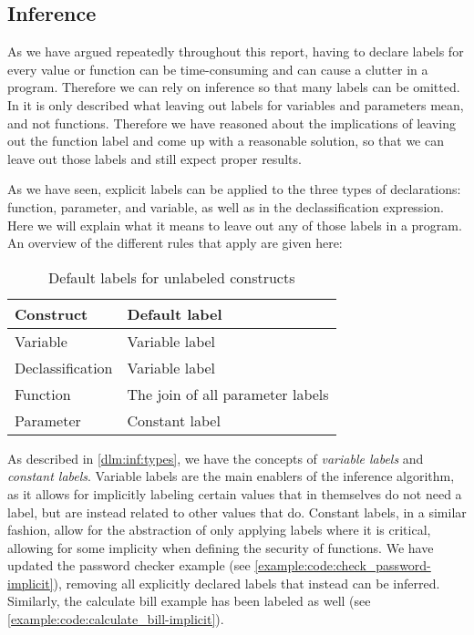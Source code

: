 \subsection{Inference}
As we have argued repeatedly throughout this report, having to declare labels for every value or function can be time-consuming and can cause a clutter in a program.
Therefore we can rely on inference so that many labels can be omitted.
In \cite{myers1997} it is only described what leaving out labels for variables and parameters mean, and not functions.
Therefore we have reasoned about the implications of leaving out the function label and come up with a reasonable solution, so that we can leave out those labels and still expect proper results.

As we have seen, explicit labels can be applied to the three types of declarations: function, parameter, and variable, as well as in the declassification expression.
Here we will explain what it means to leave out any of those labels in a program.
An overview of the different rules that apply are given here:
\begin{table}[H]
  \begin{tabularx}{\textwidth}{|l|X|}
    \hline
    \textbf{Construct} & \textbf{Default label} \\ \hline \hline
    Variable & Variable label \\ \hline
    Declassification & Variable label \\ \hline
    Function & The join of all parameter labels \\ \hline
    Parameter & Constant label \\ \hline
  \end{tabularx}
  \caption{Default labels for unlabeled constructs}
  \label{informal:table:default_labels}
\end{table}

As described in \cref{dlm:inf:types}, we have the concepts of \emph{variable labels} and \emph{constant labels}.
Variable labels are the main enablers of the inference algorithm, as it allows for implicitly labeling certain values that in themselves do not need a label, but are instead related to other values that do.
Constant labels, in a similar fashion, allow for the abstraction of only applying labels where it is critical, allowing for some implicity when defining the security of functions.
We have updated the password checker example (see \cref{example:code:check_password-implicit}), removing all explicitly declared labels that instead can be inferred.
Similarly, the calculate bill example has been labeled as well (see \cref{example:code:calculate_bill-implicit}).

